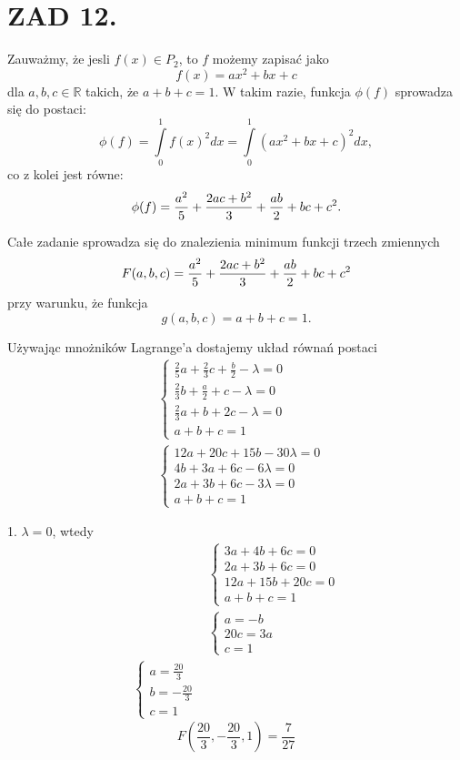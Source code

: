 \documentclass{article}[13pt]
\newcommand{\R}{\mathds{R}}
\begin{document}
    \section*{ZAD 12.}

    Zauważmy, że jesli $f(x)\in P_2$, to $f$ możemy zapisać jako
    $$f(x)=ax^2+bx+c$$
    dla $a,b,c\in\R$ takich, że $a+b+c=1$. W takim razie, funkcja $\phi(f)$ sprowadza się do postaci:
    $$\phi(f)=\int\limits_0^1f(x)^2dx=\int\limits_0^1(ax^2+bx+c)^2dx,$$
    co z kolei jest równe:
    $$\phi(f)={a^2\over5}+{2ac+b^2\over3}+{ab\over2}+bc+c^2.$$

    Całe zadanie sprowadza się do znalezienia minimum funkcji trzech zmiennych
    $$F(a,b,c)={a^2\over5}+{2ac+b^2\over3}+{ab\over2}+bc+c^2$$
    przy warunku, że funkcja
    $$g(a,b,c)=a+b+c=1.$$

    Używając mnożników Lagrange'a dostajemy układ równań postaci
    \begin{align*}
        &\begin{cases}
            \frac25a+\frac23c+\frac b2-\lambda=0\\
            \frac23b+\frac a2+c-\lambda=0\\
            \frac23a+b+2c-\lambda=0\\
            a+b+c=1
        \end{cases}\\
        &\begin{cases}
            12a+20c+15b-30\lambda=0\\
            4b+3a+6c-6\lambda=0\\
            2a+3b+6c-3\lambda=0\\
            a+b+c=1
        \end{cases}
    \end{align*}

    {\color{def}1. $\lambda=0$}, wtedy
    \begin{align*}
        &\begin{cases}
            3a+4b+6c=0\\
            2a+3b+6c=0\\
            12a+15b+20c=0\\
            a+b+c=1
        \end{cases}\\
        &\begin{cases}
            a=-b\\
            20c=3a\\
            c=1
        \end{cases}\\
        \begin{cases}
            a=\frac{20}3\\
            b=-\frac{20}3\\
            c=1
        \end{cases}
    \end{align*}
        $$F(\frac{20}3,-\frac{20}3,1)=\frac7{27}$$
\end{document}
